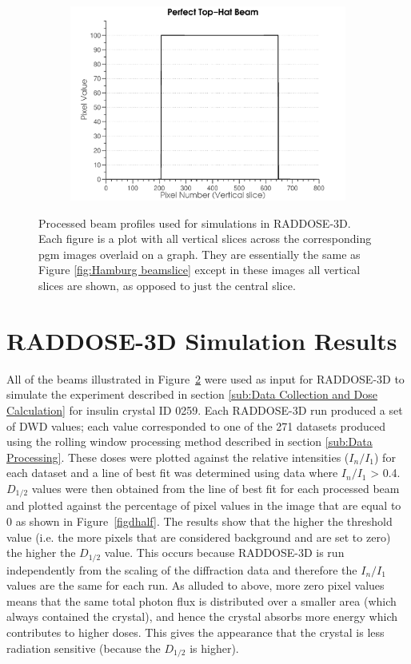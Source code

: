 \begin{figure}
\begin{subfigure}[b]{0.45\textwidth}
                \centering
                \includegraphics[width=\textwidth]{figures/beam/fig_beam_ideal.pdf}
                \caption{}
                \label{figallbeams9}
        \end{subfigure}
        \caption{Processed beam profiles used for simulations in RADDOSE-3D.
        Each figure is a plot with all vertical slices across the corresponding pgm images overlaid on a graph.
        They are essentially the same as Figure \ref{fig:Hamburg beamslice} except in these images all vertical slices are shown, as opposed to just the central slice.}
        \label{figallbeamscont}
\end{figure}

\section{RADDOSE-3D Simulation Results}
All of the beams illustrated in Figure~\ref{figallbeamscont} were used as input for RADDOSE-3D to simulate the experiment described in section \ref{sub:Data Collection and Dose Calculation} for insulin crystal ID 0259.
Each RADDOSE-3D run produced a set of DWD values; each value corresponded to one of the 271 datasets produced using the rolling window processing method described in section \ref{sub:Data Processing}.
These doses were plotted against the relative intensities ($I_n / I_1$) for each dataset and a line of best fit was determined using data where $I_n / I_1$ > 0.4.
$D_{1/2}$ values were then obtained from the line of best fit for each processed beam and plotted against the percentage of pixel values in the image that are equal to 0 as shown in Figure~\ref{figdhalf}.
The results show that the higher the threshold value (i.e. the more pixels that are considered background and are set to zero) the higher the $D_{1/2}$ value.
This occurs because RADDOSE-3D is run independently from the scaling of the diffraction data and therefore the $I_n/I_1$ values are the same for each run.
As alluded to above, more zero pixel values means that the same total photon flux is distributed over a smaller area (which always contained the crystal), and hence the crystal absorbs more energy which contributes to higher doses.
This gives the appearance that the crystal is less radiation sensitive (because the $D_{1/2}$ is higher).

